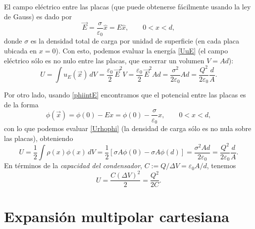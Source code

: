 El campo eléctrico entre las placas (que puede obtenerse fácilmente usando la ley de Gauss) es dado por
\begin{equation}
\vec{E}=\frac{\sigma}{\varepsilon_0}\hat{x}=E\hat{x}, \qquad 0<x<d,
\end{equation}
donde $\sigma$ es la densidad total de carga por unidad de superficie (en cada placa ubicada en $x=0$). Con esto, podemos evaluar la energía \eqref{UuE} (el campo eléctrico sólo es no nulo entre las placas, que encerrar un volumen $V=Ad$):
\begin{equation} 
U=\int u_E(\vec{x})\,dV=\frac{\varepsilon_0}{2}\,
\vec{E}^2 V=\frac{\varepsilon_0}{2}\,
\vec{E}^2 Ad=\frac{\sigma^2}{2\varepsilon_0}Ad=\frac{Q^2}{2\varepsilon_0}\frac{d}{A} .
\end{equation}

Por otro lado, usando \eqref{phiintE} encontramos que el potencial entre las placas es de la forma
\begin{equation}
\phi(\vec{x})=\phi(0)-Ex=\phi(0)-\frac{\sigma}{\varepsilon_0}x, \qquad 0<x<d,
\end{equation}
con lo que podemos evaluar \eqref{Urhophi} (la densidad de carga sólo es no nula sobre las placas), obteniendo
\begin{equation}
U=\frac{1}{2}\int\rho(x)\phi(x)\,dV=\frac{1}{2}\left[\sigma A\phi(0)-\sigma A\phi(d)\right]=\frac{\sigma^2 Ad}{2\varepsilon_0}=\frac{Q^2}{2\varepsilon_0}\frac{d}{A}.
\end{equation}
En términos de la \textit{capacidad del condensador}, $C:=Q/\Delta V=\varepsilon_0 A/d$, tenemos
\begin{equation}
U=\frac{C(\Delta V)^2}{2}=\frac{Q^2}{2C}.
\end{equation}





\section{Expansión multipolar cartesiana}
